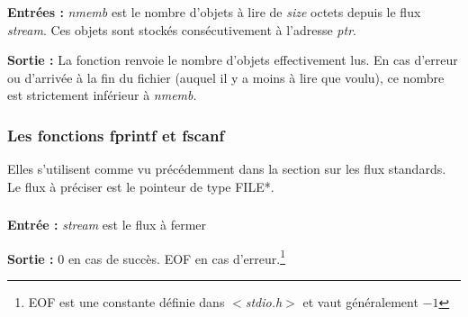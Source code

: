 \documentclass[../../../main.tex]{subfiles}
\begin{document}
\subsubsection{}
\label{ssub:fread}
\textbf{Entrées :}\newline
\textit{nmemb} est le nombre d'objets à lire de \textit{size} octets depuis le flux \textit{stream}. Ces objets sont stockés consécutivement à l'adresse \textit{ptr}.
 
\textbf{Sortie :} La fonction renvoie le nombre d'objets effectivement lus. En cas d'erreur ou d'arrivée à la fin du fichier (auquel il y a moins à lire que voulu), ce nombre est strictement inférieur à \textit{nmemb}.
\subsubsection{Les fonctions \textsf{fprintf} et \textsf{fscanf}}
\label{ssub:fprintf_fscanf}
Elles s'utilisent comme vu précédemment dans la section sur les flux standards. Le flux à préciser est le pointeur de type \textsf{FILE*}.
\subsubsection{}
\label{ssub:fclose}
\textbf{Entrée :} \textit{stream} est le flux à fermer
 
\textbf{Sortie :} 0 en cas de succès. \textsf{EOF} en cas d'erreur.\footnote{\textsf{EOF} est une constante définie dans \textit{$<$stdio.h$>$} et vaut généralement $-1$}
\end{document}
